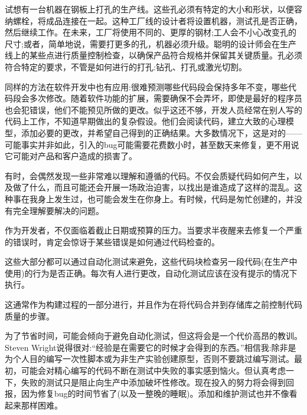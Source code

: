 试想有一台机器在钢板上打孔的生产线。这些孔必须有特定的大小和形状，以便容纳螺栓，将成品连接在一起。这种工厂线的设计者将设置机器，测试孔是否正确，然后继续工作。在未来，工厂将使用不同的、更厚的钢材;工人会不小心改变孔的尺寸;或者，简单地说，需要打更多的孔，机器必须升级。聪明的设计师会在生产线上的某些点进行质量控制检查，以确保产品符合规格并保留其关键质量。孔必须符合特定的要求，不管是如何进行的打孔:钻孔、打孔或激光切割。

同样的方法在软件开发中也有应用:很难预测哪些代码段会保持多年不变，哪些代码段会多次修改。随着软件功能的扩展，需要确保不会弄坏，即使是最好的程序员也会犯错误，他们不能预见所做的更改。似乎这还不够，开发人员经常在别人写的代码上工作，不知道早期做出的复杂假设。他们会阅读代码，建立大致的心理模型，添加必要的更改，并希望自己得到的正确结果。大多数情况下，这是对的——可能事实并非如此，引入的bug可能需要花费数小时，甚至数天来修复，更不用说它可能对产品和客户造成的损害了。

有时，会偶然发现一些非常难以理解和遵循的代码。不仅会质疑代码如何产生，以及做了什么，而且可能还会开展一场政治迫害，以找出是谁造成了这样的混乱。这种事在我身上发生过，也可能会发生在你身上。有时候，代码是匆忙创建的，并没有完全理解要解决的问题。

作为开发者，不仅面临着截止日期或预算的压力。当要求半夜醒来去修复一个严重的错误时，肯定会惊讶于某些错误是如何通过代码检查的。

这些大部分都可以通过自动化测试来避免，这些代码块检查另一段代码(在生产中使用)的行为是否正确。每次有人进行更改，自动化测试应该在没有提示的情况下执行。

这通常作为构建过程的一部分进行，并且作为在将代码合并到存储库之前控制代码质量的步骤。

为了节省时间，可能会倾向于避免自动化测试，但这将会是一个代价高昂的教训。Steven Wright说得很对:“经验是在需要它的时候才会得到的东西。”相信我:除非是为个人目的编写一次性脚本或为非生产实验创建原型，否则不要跳过编写测试。最初，可能会对精心编写的代码不断在测试中失败的事实感到恼火。但认真考虑一下，失败的测试只是阻止向生产中添加破坏性修改。现在投入的努力将会得到回报，因为修复bug的时间节省了(以及一整晚的睡眠)。添加和维护测试也并不像看起来那样困难。






























